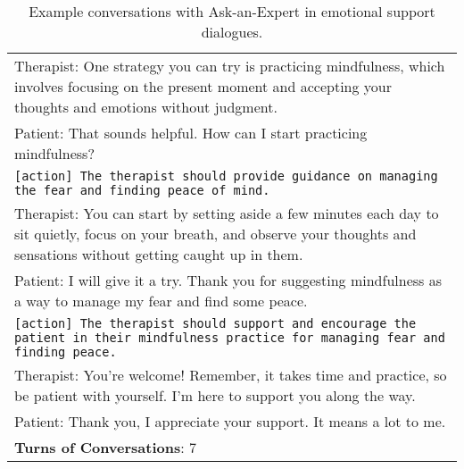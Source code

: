 \begin{table}[]
\begin{tabular}{p{13.5cm}}
    Therapist: One strategy you can try is practicing mindfulness, which involves focusing on the present moment and accepting your thoughts and emotions without judgment.\\
    Patient: That sounds helpful. How can I start practicing mindfulness?\\
    \texttt{[action] The therapist should provide guidance on managing the fear and finding peace of mind.}\\
    Therapist: You can start by setting aside a few minutes each day to sit quietly, focus on your breath, and observe your thoughts and sensations without getting caught up in them.\\
    Patient: I will give it a try. Thank you for suggesting mindfulness as a way to manage my fear and find some peace.\\
    \texttt{[action] The therapist should support and encourage the patient in their mindfulness practice for managing fear and finding peace.}\\
    Therapist: You're welcome! Remember, it takes time and practice, so be patient with yourself. I'm here to support you along the way.\\
    Patient: Thank you, I appreciate your support. It means a lot to me.\\
    \midrule
    \textbf{Turns of Conversations}: 7\\
    \bottomrule
    \end{tabular}
    \caption{Example conversations with Ask-an-Expert in emotional support dialogues. }
    \label{tab:esc_case_2}
\end{table}



